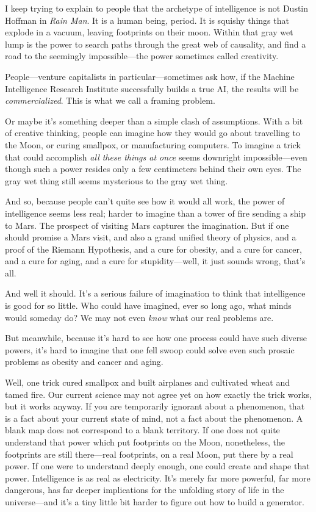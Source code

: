  I keep trying to explain to people that the archetype of
intelligence is not Dustin Hoffman in \textit{Rain Man}. It is a human
being, period. It is squishy things that explode in a vacuum, leaving
footprints on their moon. Within that gray wet lump is the power to
search paths through the great web of causality, and find a road to the
seemingly impossible---the power sometimes called creativity.


 People---venture capitalists in particular---sometimes ask how, if
the Machine Intelligence Research Institute successfully builds a true
AI, the results will be \textit{commercialized}. This is what we call a
framing problem.


 Or maybe it's something deeper than a simple clash
of assumptions. With a bit of creative thinking, people can imagine how
they would go about travelling to the Moon, or curing smallpox, or
manufacturing computers. To imagine a trick that could accomplish
\textit{all these things at once} seems downright impossible---even
though such a power resides only a few centimeters behind their own
eyes. The gray wet thing still seems mysterious to the gray wet thing.


 And so, because people can't quite see how it
would all work, the power of intelligence seems less real; harder to
imagine than a tower of fire sending a ship to Mars. The prospect of
visiting Mars captures the imagination. But if one should promise a
Mars visit, and also a grand unified theory of physics, and a proof of
the Riemann Hypothesis, and a cure for obesity, and a cure for cancer,
and a cure for aging, and a cure for stupidity---well, it just sounds
wrong, that's all.


 And well it should. It's a serious failure of
imagination to think that intelligence is good for so little. Who could
have imagined, ever so long ago, what minds would someday do? We may
not even \textit{know} what our real problems are.


 But meanwhile, because it's hard to see how one
process could have such diverse powers, it's hard to
imagine that one fell swoop could solve even such prosaic problems as
obesity and cancer and aging.


 Well, one trick cured smallpox and built airplanes and cultivated
wheat and tamed fire. Our current science may not agree yet on how
exactly the trick works, but it works anyway. If you are temporarily
ignorant about a phenomenon, that is a fact about your current state of
mind, not a fact about the phenomenon. A blank map does not correspond
to a blank territory. If one does not quite understand that power which
put footprints on the Moon, nonetheless, the footprints are still
there---real footprints, on a real Moon, put there by a real power. If
one were to understand deeply enough, one could create and shape that
power. Intelligence is as real as electricity. It's
merely far more powerful, far more dangerous, has far deeper
implications for the unfolding story of life in the universe---and
it's a tiny little bit harder to figure out how to
build a generator.

